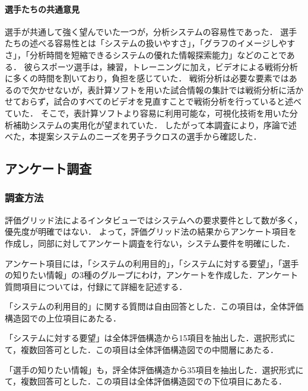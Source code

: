 \documentclass[sotsuron]{kuee}
\begin{document}
				\paragraph{選手たちの共通意見}
					選手が共通して強く望んでいた一つが，分析システムの容易性であった．
					選手たちの述べる容易性とは「システムの扱いやすさ」，「グラフのイメージしやすさ」，「分析時間を短縮できるシステムの優れた情報探索能力」などのことである．
					彼らスポーツ選手は，練習，トレーニングに加え，ビデオによる戦術分析に多くの時間を割いており，負担を感じていた．
					戦術分析は必要な要素ではあるので欠かせないが，表計算ソフトを用いた試合情報の集計では戦術分析に活かせておらず，試合のすべてのビデオを見直すことで戦術分析を行っていると述べていた．
					そこで，表計算ソフトより容易に利用可能な，可視化技術を用いた分析補助システムの実用化が望まれていた．
					したがって本調査により，序論で述べた，本提案システムのニーズを男子ラクロスの選手から確認した．
		\subsection{アンケート調査}
			\subsubsection{調査方法}
				評価グリッド法によるインタビューではシステムへの要求要件として数が多く，優先度が明確ではない．
				よって，評価グリッド法の結果からアンケート項目を作成し，同部に対してアンケート調査を行ない，システム要件を明確にした．
				
				アンケート項目には，「システムの利用目的」，「システムに対する要望」，「選手の知りたい情報」の3種のグループにわけ，アンケートを作成した．アンケート質問項目については，付録にて詳細を記述する．

				「システムの利用目的」に関する質問は自由回答とした．この項目は，全体評価構造図での上位項目にあたる．

				「システムに対する要望」は全体評価構造から15項目を抽出した．選択形式にて，複数回答可とした．この項目は全体評価構造図での中間層にあたる．

				「選手の知りたい情報」も，評全体評価構造から35項目を抽出した．選択形式にて，複数回答可とした．この項目は全体評価構造図での下位項目にあたる．
\end{document}
